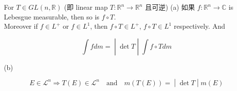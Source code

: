\begin{theorem}{}

For \(T \in GL(n,\mathbb{R})\) (即 linear map \(T:\mathbb{R}^{n}\rightarrow\mathbb{R}^{n}\) 且可逆) (a) 如果 \(f:\mathbb{R}^{n}\rightarrow\mathbb{C}\) is Lebesgue measurable, then so is \(f \circ T\).\\
Moreover if \(f \in L^{+}\) or \(f \in L^{1}\), then \(f \circ T \in L^{+}\), \(f \circ T \in L^{1}\) respectively. And

\[\left. \int f dm = \middle| \det T \middle| \int f \circ T dm \right.\]

(b)

\[\left. E \in \mathcal{L}^{n}\Longrightarrow T(E) \in \mathcal{L}^{n}\quad\text{and}\quad m(T(E)) = \middle| \det T \middle| m(E) \right.\]

\end{theorem}

